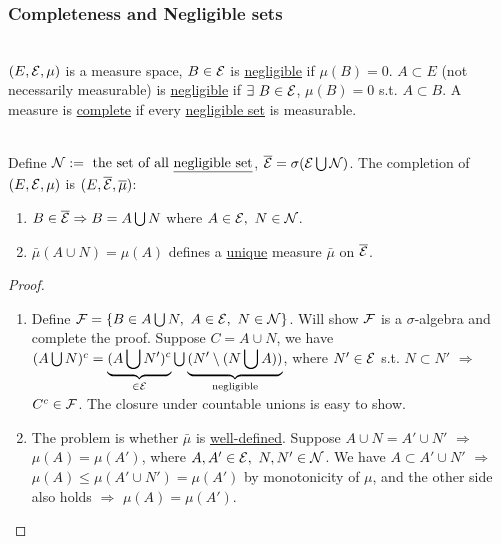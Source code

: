 \vspace{6pt}
\subsubsection{Completeness and Negligible sets}
\begin{definition}\ \\
$(E,\mathcal{E},\mu)$ is a measure space, $B \in \mathcal{E}$ is \underline{negligible} if $\mu(B) = 0$. $A \subset E$ (not necessarily measurable) is \underline{negligible} if $\exists\ B \in \mathcal{E}$, $\mu(B) = 0$ s.t. $A \subset B$. A measure is \underline{complete} if every \underline{negligible set} is measurable. 
\end{definition}

\vspace{3pt}
\begin{proposition}[Completion]\ \\
Define $\mathcal{N} := \text{ the set of all \underline{negligible set}}$, $\overline{\mathcal{E}} = \sigma(\mathcal{E} \bigcup \mathcal{N})$. The completion of $(E,\mathcal{E},\mu)$ is $(E,\overline{\mathcal{E}},\overline{\mu})$: 
\begin{enumerate}[label = (\alph*)]
    \item $B \in \overline{\mathcal{E}}\Rightarrow B = A \bigcup N$ where $A \in \mathcal{E},\ N \in \mathcal{N}$.
    \item $\bar{\mu} (A \cup N) = \mu(A)$ defines a \underline{unique} measure $\bar{\mu}$ on $\overline{\mathcal{E}}$.
\end{enumerate}
\end{proposition}
\begin{proof}\
\begin{enumerate}[label = (\alph*)]
    \item Define $\mathcal{F} = \{B \in A \bigcup N,\ A \in \mathcal{E},\ N \in \mathcal{N}\}$. Will show $\mathcal{F}$ is a $\sigma$-algebra and complete the proof. Suppose $C = A \cup N$, we have $(A \bigcup N)^c = \underbrace{(A \bigcup N')^c}_{\in \mathcal{E}} \bigcup \underbrace{(N' \setminus (N \bigcup A))}_{{\text{negligible}}}$, where $N' \in \mathcal{E}$ s.t. $N \subset N'$ $\Rightarrow$ $C^c \in \mathcal{F}$. The closure under countable unions is easy to show.
    \item The problem is whether $\bar{\mu}$ is \underline{well-defined}. Suppose $A \cup N = A' \cup N'$ $\Rightarrow$ $\mu(A) = \mu(A')$, where $A,A' \in \mathcal{E},\ N,N' \in \mathcal{N}$. We have $A \subset A' \cup N'$ $\Rightarrow$ $\mu(A) \leq \mu(A' \cup N') = \mu(A')$ by monotonicity of $\mu$, and the other side also holds $\Rightarrow$ $\mu(A) = \mu(A')$.
\end{enumerate}
\end{proof}


